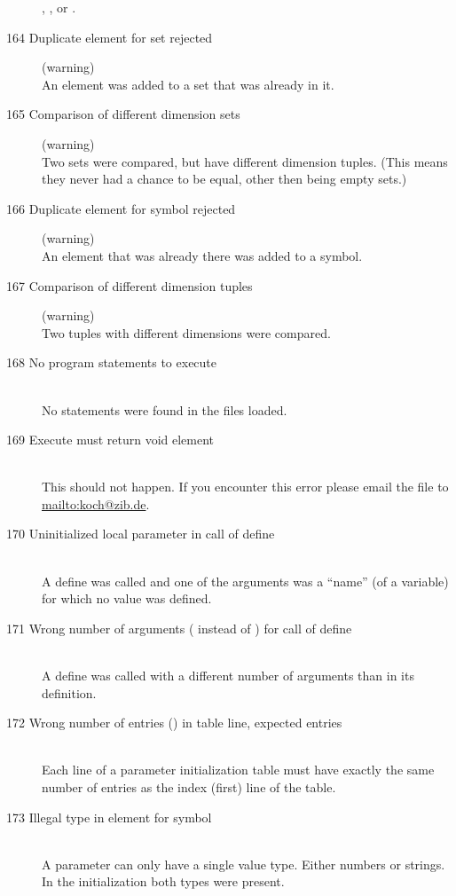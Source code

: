 \begin{description}
  , , or .
%
%
\item[164 Duplicate element \code{xxx} for set rejected] (warning)\ \\
   An element was added to a set that was already in it.
\item[165 Comparison of different dimension sets] (warning)\ \\
   Two sets were compared, but have different dimension tuples.
   (This means they never had a chance to
   be equal, other then being empty sets.)
%
%
\item[166 Duplicate element \code{xxx} for symbol \code{yyy} rejected]
   (warning)\ \\
  An element that was already there was added to a symbol.
%
%
\item[167 Comparison of different dimension tuples] (warning)\ \\
  Two tuples with different dimensions were compared.
%
%
\item[168 No program statements to execute]\ \\
  No \zimpl statements were found in the files loaded.
%
%
\item[169 Execute must return void element]\ \\
  This should not happen. If you encounter
  this error please email the  file to \url{mailto:koch@zib.de}.
%
%
\item[170 Uninitialized local parameter \code{xxx} in call of
  define \code{yyy}]\ \\
  A define was called and one of the arguments was a ``name'' 
  (of a variable) for which no value was defined.
\item[171 Wrong number of arguments (\code{xxx} instead of \code{yyy})
  for call of define \code{zzz}]\ \\
  A define was called with a different number of arguments than in
  its definition.
\item[172 Wrong number of entries (\code{xxx}) in table line, 
  expected \code{yyy} entries]\ \\
  Each line of a parameter initialization table must have
  exactly the same number of entries as the index (first) line of
  the table.
\item[173 Illegal type in element \code{xxx} for symbol]\ \\
  A parameter can only have a single value type. Either numbers or
  strings. In the initialization both types were present.

\end{description}
